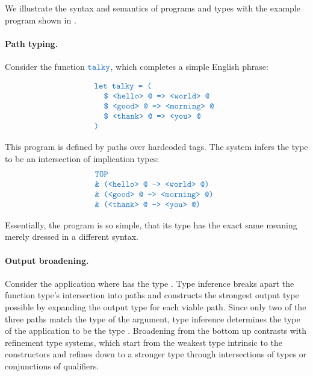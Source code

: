 \documentclass[acmsmall]{acmart}
\theoremstyle{definition}
\begin{document}
We illustrate the syntax and semantics of programs and types with the example program shown in .

\paragraph{Path typing.}
Consider the function $\obj{talky}$, which completes a simple English phrase:

\[
  \begin{array}[t]{@{} l}
    \obj{let talky = (}
      \\
      \I \obj{\$ <hello> @ => <world> @}
      \\
      \I \obj{\$ <good> @ => <morning> @} 
      \\
      \I \obj{\$ <thank> @ => <you> @} 
      \\
    \obj{)}
  \end{array}
\]

This program is defined by paths over hardcoded tags.
The system infers the type to be an intersection of implication types:
\[
  \begin{array}[t]{@{} l}
    \obj{TOP}
    \\
    \obj{\& (<hello> @ -> <world> @)}
    \\
    \obj{\& (<good> @ -> <morning> @)} 
    \\
    \obj{\& (<thank> @ -> <you> @)}
  \end{array}
\]

Essentially, the program is so simple, that its type has the exact same meaning merely dressed in a different syntax.

\paragraph{Output broadening.}
Consider the application  where  has the type . 
Type inference breaks apart the function type's intersection into paths and 
constructs the strongest output type possible by expanding the output type
for each viable path. Since only two of the three paths 
match the type of the argument, type inference determines the type of the application to be the type 
.
Broadening from the bottom up contrasts with refinement type systems, which start from
the weakest type intrinsic to the constructors and refines down to a stronger type
through intersections of types or conjunctions of qualifiers.
\end{document}
